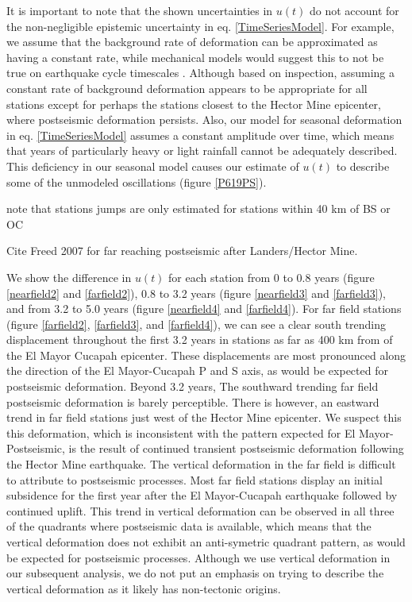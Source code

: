 \documentclass[12pt]{article}
\begin{document}
It is important to note that the shown uncertainties in $u(t)$ do not account for the non-negligible epistemic uncertainty in eq. \ref{TimeSeriesModel}.  For example, we assume that the background rate of deformation can be approximated as having a constant rate, while mechanical models would suggest this to not be true on earthquake cycle timescales \citep{Thatcher1983}. Although based on inspection,  assuming a constant rate of background deformation appears to be appropriate for all stations except for perhaps the stations closest to the Hector Mine epicenter, where postseismic deformation persists.  Also, our model for seasonal deformation in eq. \ref{TimeSeriesModel} assumes a constant amplitude over time, which means that years of particularly heavy or light rainfall cannot be adequately described.  This deficiency in our seasonal model causes our estimate of $u(t)$ to describe some of the unmodeled oscillations (figure \ref{P619PS}).          

note that stations jumps are only estimated for stations within 40 km of BS or OC



         


Cite Freed 2007 for far reaching postseismic after Landers/Hector Mine.



We show the difference in $u(t)$ for each station from 0 to 0.8 years (figure \ref{nearfield2} and \ref{farfield2}), 0.8 to 3.2 years (figure \ref{nearfield3} and \ref{farfield3}), and from 3.2 to 5.0 years (figure \ref{nearfield4} and \ref{farfield4}).  For far field stations (figure \ref{farfield2}, \ref{farfield3}, and \ref{farfield4}), we can see a clear south trending displacement throughout the first 3.2 years in stations as far as 400 km from of the El Mayor Cucapah epicenter.  These displacements are most pronounced along the direction of the El Mayor-Cucapah P and S axis, as would be expected for postseismic deformation.  Beyond 3.2 years, The southward trending far field postseismic deformation is barely perceptible. There is however, an eastward trend in far field stations just west of the Hector Mine epicenter.  We suspect this this deformation, which is inconsistent with the pattern expected for El Mayor-Postseismic, is the result of continued transient postseismic deformation following the Hector Mine earthquake.  The vertical deformation in the far field is difficult to attribute to postseismic processes.  Most far field stations display an initial subsidence for the first year after the El Mayor-Cucapah earthquake followed by continued uplift.  This trend in vertical deformation can be observed in all three of the quadrants where postseismic data is available, which means that the vertical deformation does not exhibit an anti-symetric quadrant pattern, as would be expected for postseismic processes.  Although we use vertical deformation in our subsequent analysis, we do not put an emphasis on trying to describe the vertical deformation as it likely has non-tectonic origins.        
\end{document}

